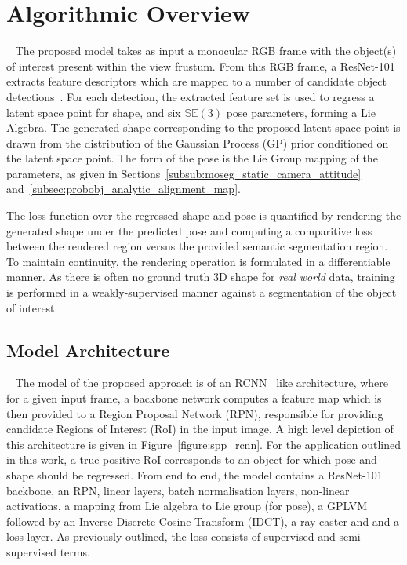 \section{Algorithmic Overview}
~\label{sec:spp_algorithm}
The proposed model takes as input a monocular RGB frame with the object(s) of interest present within the 
view frustum. From this RGB frame, a ResNet-101~\cite{He2015} extracts feature descriptors which are mapped 
to a number of candidate object detections~\cite{Girshick2014,Girshick2015_2}. For each detection, the extracted 
feature set is used to regress a latent space point for shape, and six \( \mathbb{SE}(3) \) pose parameters, forming 
a Lie Algebra. The generated shape corresponding to the proposed latent space point is drawn from the distribution 
of the Gaussian Process (GP) prior conditioned on the latent space point. The form of the pose is the Lie 
Group mapping of the parameters, as given in Sections~\ref{subsub:moseg_static_camera_attitude} 
and~\ref{subsec:probobj_analytic_alignment_map}. 

The loss function over the regressed shape and pose is quantified by rendering the generated shape 
under the predicted pose and computing a comparitive loss between the rendered region versus the provided semantic 
segmentation region. To maintain continuity, the rendering operation is formulated in a differentiable manner. As there 
is often no ground truth 3D shape for \textit{real world} data, training is performed in a weakly-supervised manner against a 
segmentation of the object of interest.

\subsection{Model Architecture}
~\label{subsec:spp_network_architecture}
The model of the proposed approach is of an RCNN~\cite{Girshick2014} like architecture, where for a 
given input frame, a backbone network computes a feature map which is then provided to a Region 
Proposal Network (RPN), responsible for providing candidate Regions of Interest (RoI) in the input image. 
A high level depiction of this architecture is given in Figure~\ref{figure:spp_rcnn}.
For the application outlined in this work, a true positive RoI corresponds to an object for which pose and 
shape should be regressed. From end to end, the model contains a ResNet-101~\cite{He2015} backbone, an RPN,
linear layers, batch normalisation layers, non-linear activations, a mapping from Lie algebra to 
Lie group (for pose), a GPLVM followed by an Inverse Discrete Cosine Transform (IDCT), a ray-caster and 
and a loss layer. As previously outlined, the loss consists of supervised and semi-supervised terms.

